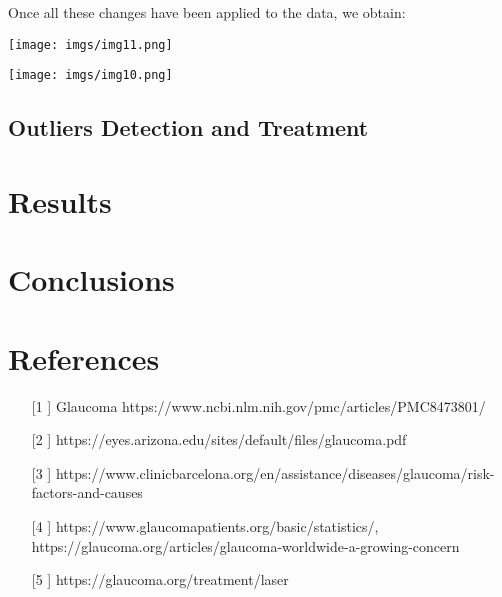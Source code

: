 \documentclass{article}
\begin{document}
Once all these changes have been applied to the data, we obtain:

\begin{center}
    {\texttt{[image: imgs/img11.png]}\par}
    {\texttt{[image: imgs/img10.png]}\par}
\end{center}

\subsection{Outliers Detection and Treatment}



\section{Results}
\section{Conclusions}

\section{References}

\begin{itemize}
    \item [ [1] ] Glaucoma https://www.ncbi.nlm.nih.gov/pmc/articles/PMC8473801/
    \item [[2]] https://eyes.arizona.edu/sites/default/files/glaucoma.pdf
    \item [[3]] https://www.clinicbarcelona.org/en/assistance/diseases/glaucoma/risk-factors-and-causes
    \item [[4]] https://www.glaucomapatients.org/basic/statistics/, 
    https://glaucoma.org/articles/glaucoma-worldwide-a-growing-concern 
    \item [[5]] https://glaucoma.org/treatment/laser

\end{itemize}
\end{document}
